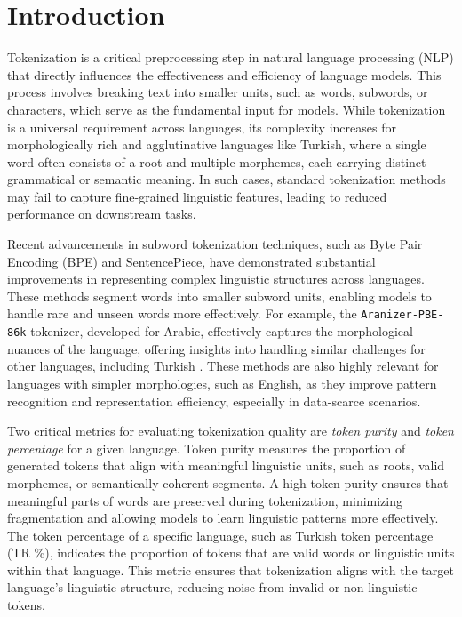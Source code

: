 \section{Introduction}

Tokenization is a critical preprocessing step in natural language processing (NLP) that directly influences the effectiveness and efficiency of language models. This process involves breaking text into smaller units, such as words, subwords, or characters, which serve as the fundamental input for models. While tokenization is a universal requirement across languages, its complexity increases for morphologically rich and agglutinative languages like Turkish, where a single word often consists of a root and multiple morphemes, each carrying distinct grammatical or semantic meaning. In such cases, standard tokenization methods may fail to capture fine-grained linguistic features, leading to reduced performance on downstream tasks.

Recent advancements in subword tokenization techniques, such as Byte Pair Encoding (BPE) and SentencePiece, have demonstrated substantial improvements in representing complex linguistic structures across languages. These methods segment words into smaller subword units, enabling models to handle rare and unseen words more effectively. For example, the \texttt{Aranizer-PBE-86k} tokenizer, developed for Arabic, effectively captures the morphological nuances of the language, offering insights into handling similar challenges for other languages, including Turkish \cite{koubaa_githubcomriotu-labaranizer_2024}. These methods are also highly relevant for languages with simpler morphologies, such as English, as they improve pattern recognition and representation efficiency, especially in data-scarce scenarios.

Two critical metrics for evaluating tokenization quality are \textit{token purity} and \textit{token percentage} for a given language. Token purity measures the proportion of generated tokens that align with meaningful linguistic units, such as roots, valid morphemes, or semantically coherent segments. A high token purity ensures that meaningful parts of words are preserved during tokenization, minimizing fragmentation and allowing models to learn linguistic patterns more effectively. The token percentage of a specific language, such as Turkish token percentage (TR \%), indicates the proportion of tokens that are valid words or linguistic units within that language. This metric ensures that tokenization aligns with the target language's linguistic structure, reducing noise from invalid or non-linguistic tokens.


